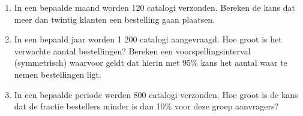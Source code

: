 
\begin{enumerate}[label=(\alph*)]
    \item In een bepaalde maand worden 120 catalogi verzonden.
    Bereken de kans dat meer dan twintig klanten een bestelling gaan plaatsen.
    \answer{

    }

    \item In een bepaald jaar worden 1 200 catalogi aangevraagd.
    Hoe groot is het verwachte aantal bestellingen? Bereken een voorspellingsinterval (symmetrisch) waarvoor geldt dat hierin met 95\% kans het aantal waar te nemen bestellingen ligt.
    \answer{

    }

    \item In een bepaalde periode werden 800 catalogi verzonden.
    Hoe groot is de kans dat de fractie bestellers minder is dan 10\% voor deze groep aanvragers?
    \answer{

    }

\end{enumerate}